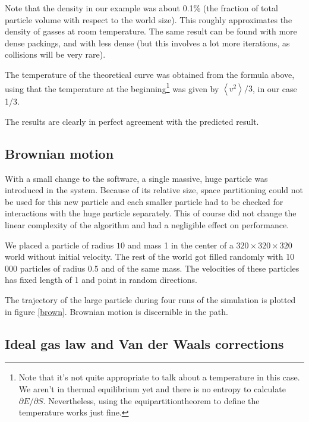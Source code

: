 Note that the density in our example was about 0.1\% (the fraction of total 
particle volume with respect to the world size). This roughly approximates 
the density of gasses at room temperature. The same result can be found 
with more dense packings, and with less dense (but this involves a lot more 
iterations, as collisions will be very rare).

The temperature of the theoretical curve was obtained from the formula 
above, using that the temperature at the beginning\footnote{Note that it's 
not quite appropriate to talk about a temperature in this case. We aren't 
in thermal equilibrium yet and there is no entropy to calculate $\partial E 
/ \partial S$. Nevertheless, using the equipartitiontheorem to define the 
temperature works just fine.}
was given by $\left<v^2\right>/3$, in our case 1/3.

The results are clearly in perfect agreement with the predicted result.


\subsection{Brownian motion}
With a small change to the software, a single massive, huge particle was 
introduced in the system. Because of its relative size, space partitioning 
could not be used for this new particle and each smaller particle had to be 
checked for interactions with the huge particle separately. This of course 
did not change the linear complexity of the algorithm and had a negligible 
effect on performance.

We placed a particle of radius $10$ and mass 1 in the center of a $320 
\times 320 \times 320$ world without initial velocity. The rest of the 
world got filled randomly with 10\,000 particles of radius 0.5 and of the 
same mass. The velocities of these particles has fixed length of 1 and
point in random directions.

The trajectory of the large particle during four runs of the simulation is 
plotted in figure \ref{brown}. Brownian motion is discernible in the path.



\subsection{Ideal gas law and Van der Waals corrections}

